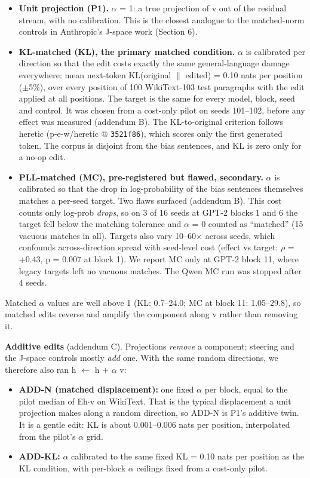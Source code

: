 \documentclass[
  10pt,
]{article}
\providecommand{\tightlist}{%
  \setlength{\itemsep}{0pt}\setlength{\parskip}{0pt}}
\begin{document}
\begin{itemize}
\tightlist
\item
  \textbf{Unit projection (P1).} $\alpha$ = 1: a true projection of v out of
  the residual stream, with no calibration. This is the closest analogue
  to the matched-norm controls in Anthropic's J-space work (Section 6).
\item
  \textbf{KL-matched (KL), the primary matched condition.} $\alpha$ is
  calibrated per direction so that the edit costs exactly the same
  general-language damage everywhere: mean next-token KL(original $\|$
  edited) = 0.10 nats per position ($\pm$5\%), over every position of 100
  WikiText-103 test paragraphs with the edit applied at all positions.
  The target is the same for every model, block, seed and control. It
  was chosen from a cost-only pilot on seeds 101--102, before any effect
  was measured (addendum B). The KL-to-original criterion follows
  heretic (p-e-w/heretic @ \texttt{3521f86}), which scores only the
  first generated token. The corpus is disjoint from the bias sentences,
  and KL is zero only for a no-op edit.
\item
  \textbf{PLL-matched (MC), pre-registered but flawed, secondary.} $\alpha$ is
  calibrated so that the drop in log-probability of the bias sentences
  themselves matches a per-seed target. Two flaws surfaced (addendum B).
  This cost counts only log-prob \emph{drops}, so on 3 of 16 seeds at
  GPT-2 blocks 1 and 6 the target fell below the matching tolerance and
  $\alpha$ = 0 counted as ``matched'' (15 vacuous matches in all). Targets also
  vary 10--60$\times$ across seeds, which confounds across-direction spread
  with seed-level cost (\textbar effect\textbar{} vs target: $\rho$ = +0.43,
  p = 0.007 at block 1). We report MC only at GPT-2 block 11, where
  legacy targets left no vacuous matches. The Qwen MC run was stopped
  after 4 seeds.
\end{itemize}

Matched $\alpha$ values are well above 1 (KL: 0.7--24.0; MC at block 11:
1.05--29.8), so matched edits reverse and amplify the component along v
rather than removing it.

\textbf{Additive edits} (addendum C). Projections \emph{remove} a
component; steering and the J-space controls mostly \emph{add} one. With
the same random directions, we therefore also ran h $\leftarrow$ h + $\alpha$ v:

\begin{itemize}
\tightlist
\item
  \textbf{ADD-N (matched displacement):} one fixed $\alpha$ per block, equal to
  the pilot median of E\textbar h$\cdot$v\textbar{} on WikiText. That is the
  typical displacement a unit projection makes along a random direction,
  so ADD-N is P1's additive twin. It is a gentle edit: KL is about
  0.001--0.006 nats per position, interpolated from the pilot's $\alpha$ grid.
\item
  \textbf{ADD-KL:} $\alpha$ calibrated to the same fixed KL = 0.10 nats per
  position as the KL condition, with per-block $\alpha$ ceilings fixed from a
  cost-only pilot.
\end{itemize}
\end{document}
